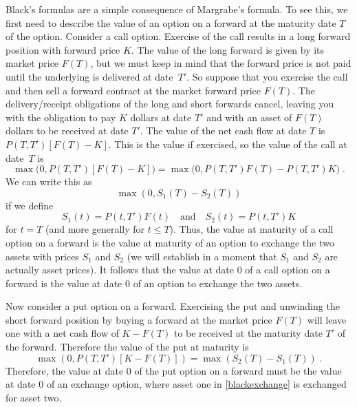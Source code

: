 Black's formulas are a simple consequence of Margrabe's formula.  To see this, we first need to describe the value of an option on a forward at the maturity date $T$ of the option.  Consider a call option.  Exercise of the call results in a long forward position with forward price $K$.  The value of the long forward is given by its market price $F(T)$, but we must keep in mind that the forward price is not paid until the underlying is delivered at date~$T'$.  So suppose that you exercise the call and then sell a forward contract at the market forward price $F(T)$.  The delivery/receipt obligations of the long and short forwards cancel, leaving you with the obligation to pay $K$ dollars at date $T'$ and with an asset of $F(T)$ dollars to be received at date $T'$.  The value of the net cash flow at date $T$ is $P(T,T')[F(T)-K]$.  This is the value if exercised, so the value of the call at date~$T$ is
\begin{equation}\label{blackcallexchange1}
\max\big(0, P(T,T')[F(T)-K]\big) = \max\big(0,P(T,T')F(T)-P(T,T')K\big)\;.\end{equation}
We can write this as
\begin{equation}\label{blackcallexchange2}
\max(0,S_1(T)-S_2(T))
\end{equation}
if we define
\begin{equation}\label{blackexchange}
S_1(t) = P(t,T')F(t) \quad \text{and} \quad S_2(t) = P(t,T')K
\end{equation}
for $t=T$ (and more generally for $t \leq T$).  Thus, the value at maturity of a call option on a forward is the value at maturity of an option to exchange the two assets with prices $S_1$ and $S_2$ (we will establish in a moment that $S_1$ and $S_2$ are actually asset prices).  It follows that the value at date 0 of a call option on a forward is the value at date 0 of an option to exchange the two assets.

Now consider a put option on a forward.  Exercising the put and unwinding the short forward position by buying a forward at the market price $F(T)$ will leave one with a net cash flow of $K-F(T)$ to be received at the maturity date $T'$ of the forward.  Therefore the value of the put at maturity is
\begin{equation}\label{blackputexchange}
\max(0,P(T,T')[K-F(T)]) = \max(S_2(T)-S_1(T))\;.
\end{equation}
Therefore, the value at date 0 of the put option on a forward must be the value at date 0 of an exchange option, where asset one in \eqref{blackexchange} is exchanged for asset two.


